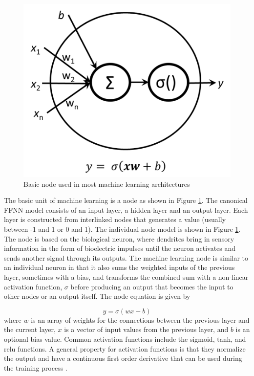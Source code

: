 \documentclass[twoside,twocolumn]{article}
\begin{document}
	\begin{figure}[!h]
		\centering
		\includegraphics[width=.7\columnwidth]{images/node.png}  %
		\caption{Basic node used in most machine learning architectures }
		\label{fig:node}
	\end{figure}
	
	The basic unit of machine learning is a node as shown in  Figure \ref{fig:node}. The canonical FFNN model consists of an input layer, a hidden layer and an output layer. Each layer is constructed from interlinked nodes that generates a value (usually between -1 and 1 or 0 and 1). The individual node model is shown in Figure \ref{fig:node}. \\
	
	The node is based on the biological neuron, where dendrites bring in sensory information in the form of bioelectric impulses until the neuron activates and sends another signal through its outputs. The machine learning node is similar to an individual neuron in that it also sums the weighted inputs of the previous layer, sometimes with a bias, and transforms the combined sum with a non-linear activation function, $\sigma$ before producing an output that becomes the input to other nodes or an output itself. The node  equation is given by
	
	\begin{equation}
	\label{eq:perceptron}
	y= \sigma(wx+b)
	\end{equation}
	\noindent
	where $w$ is an array of weights for the connections between the previous layer and the current layer, $x$ is a vector of input values from the previous layer, and $b$ is an optional bias value. Common activation functions include the sigmoid, tanh, and relu functions. A general property for activation functions is that they normalize the output and have a continuous first order derivative that can be used during the training process \citep{Goodfellow2016}. 
	
\end{document}
